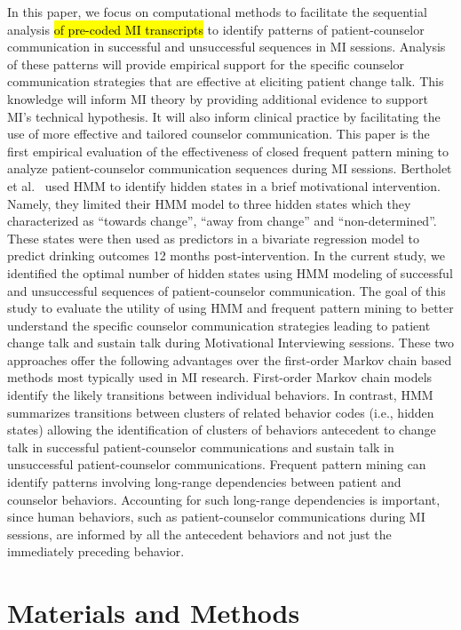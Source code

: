 \documentclass[smallextended]{svjour3}       %
\begin{document}
In this paper, we focus on computational methods to facilitate the sequential analysis \hl{of pre-coded MI transcripts} to identify patterns of patient-counselor communication in successful and unsuccessful sequences in MI sessions. Analysis of these patterns will provide empirical support for the specific counselor communication strategies that are effective at eliciting patient change talk. This knowledge will inform MI theory by providing additional evidence to support MI's technical hypothesis. It will also inform clinical practice by facilitating the use of more effective and tailored counselor communication. This paper is the first empirical evaluation of the effectiveness of closed frequent pattern mining to analyze patient-counselor communication sequences during MI sessions. Bertholet et al.~\cite{bertholet2010change} used HMM to identify hidden states in a brief motivational intervention. Namely, they limited their HMM model to three hidden states which they characterized as ``towards change'', ``away from change'' and ``non-determined''. These states were then used as predictors in a bivariate regression model to predict drinking outcomes 12 months post-intervention. In the current study, we identified the optimal number of hidden states using HMM modeling of successful and unsuccessful sequences of patient-counselor communication. The goal of this study to evaluate the utility of using HMM and frequent pattern mining to better understand the specific counselor communication strategies leading to patient change talk and sustain talk during Motivational Interviewing sessions. These two approaches offer the following advantages over the first-order Markov chain based methods most typically used in MI research. First-order Markov chain models identify the likely transitions between individual behaviors. In contrast, HMM summarizes transitions between clusters of related behavior codes (i.e., hidden states) allowing the identification of clusters of behaviors antecedent to change talk in successful patient-counselor communications and sustain talk in unsuccessful patient-counselor communications. Frequent pattern mining can identify patterns involving long-range dependencies between patient and counselor behaviors. Accounting for such long-range dependencies is important, since human behaviors, such as patient-counselor communications during MI sessions, are informed by all the antecedent behaviors and not just the immediately preceding behavior.

\section{Materials and Methods}
\label{sec:materialsAndMethods}
\end{document}
